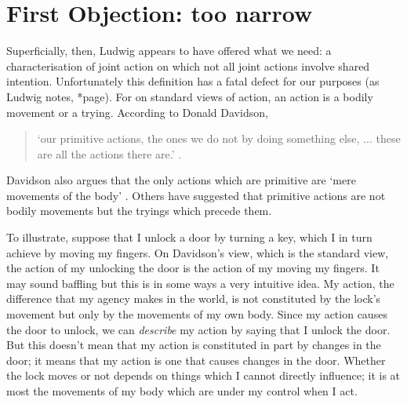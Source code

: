 \documentclass[12pt,a4paper]{extarticle}
\begin{document}
\section{First Objection: too narrow}
Superficially, then, Ludwig appears to have offered what we need: a characterisation of joint action on which not all joint actions involve shared intention.
Unfortunately this definition has a fatal defect for our purposes (as Ludwig notes, *page).
For on standard views of action, an action is a bodily movement or a trying.
According to Donald Davidson,
%
\begin{quote}
`our primitive actions, the ones we do not by doing something else, ... these are all the actions there are.'
\citep[p.\ 59]{Davidson:1971fz}.
\end{quote}
%
Davidson also argues that the only actions which are primitive are `mere movements of the body' \citep[p.\ 59]{Davidson:1971fz}.
Others have suggested that primitive actions are not bodily movements but the tryings which precede them.

To illustrate, suppose that I unlock a door by turning a key, which I in turn achieve by moving my fingers.
On Davidson's view, which is the standard view, the action of my unlocking the door is the action of my moving my fingers.
It may sound baffling but this is in some ways a very intuitive idea.
My action, the difference that my agency makes in the world,  is not constituted by the lock's movement but only by the movements of my own body.
Since my action causes the door to unlock, we can \emph{describe} my action by saying that I unlock the door.  
But this doesn't mean that my action is constituted in part by changes in the door; it means that my action is one that causes changes in the door.
Whether the lock moves or not depends on things which I cannot directly influence; it is at most the movements of my body which are under my control when I act.
\end{document}
